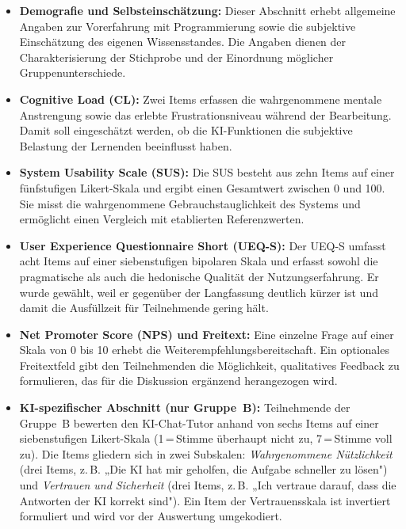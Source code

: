 \begin{itemize}
    \item \textbf{Demografie und Selbsteinschätzung:} Dieser Abschnitt erhebt allgemeine Angaben zur Vorerfahrung mit Programmierung sowie die subjektive Einschätzung des eigenen Wissensstandes. Die Angaben dienen der Charakterisierung der Stichprobe und der Einordnung möglicher Gruppenunterschiede.

    \item \textbf{Cognitive Load (CL):} Zwei Items erfassen die wahrgenommene mentale Anstrengung sowie das erlebte Frustrationsniveau während der Bearbeitung. Damit soll eingeschätzt werden, ob die KI-Funktionen die subjektive Belastung der Lernenden beeinflusst haben.

    \item \textbf{System Usability Scale (SUS):} Die SUS \cite{brooke1996} besteht aus zehn Items auf einer fünfstufigen Likert-Skala und ergibt einen Gesamtwert zwischen 0 und 100. Sie misst die wahrgenommene Gebrauchstauglichkeit des Systems und ermöglicht einen Vergleich mit etablierten Referenzwerten.

    \item \textbf{User Experience Questionnaire Short (UEQ-S):} Der UEQ-S \cite{schrepp2017} umfasst acht Items auf einer siebenstufigen bipolaren Skala und erfasst sowohl die pragmatische als auch die hedonische Qualität der Nutzungserfahrung. Er wurde gewählt, weil er gegenüber der Langfassung deutlich kürzer ist und damit die Ausfüllzeit für Teilnehmende gering hält.

    \item \textbf{Net Promoter Score (NPS) und Freitext:} Eine einzelne Frage auf einer Skala von 0 bis 10 erhebt die Weiterempfehlungsbereitschaft. Ein optionales Freitextfeld gibt den Teilnehmenden die Möglichkeit, qualitatives Feedback zu formulieren, das für die Diskussion ergänzend herangezogen wird.

    \item \textbf{KI-spezifischer Abschnitt (nur Gruppe~B):} Teilnehmende der Gruppe~B bewerten den KI-Chat-Tutor anhand von sechs Items auf einer siebenstufigen Likert-Skala (1\,=\,Stimme überhaupt nicht zu, 7\,=\,Stimme voll zu). Die Items gliedern sich in zwei Subskalen: \textit{Wahrgenommene Nützlichkeit} (drei Items, z.\,B. „Die KI hat mir geholfen, die Aufgabe schneller zu lösen") und \textit{Vertrauen und Sicherheit} (drei Items, z.\,B. „Ich vertraue darauf, dass die Antworten der KI korrekt sind"). Ein Item der Vertrauensskala ist invertiert formuliert und wird vor der Auswertung umgekodiert.
\end{itemize}

